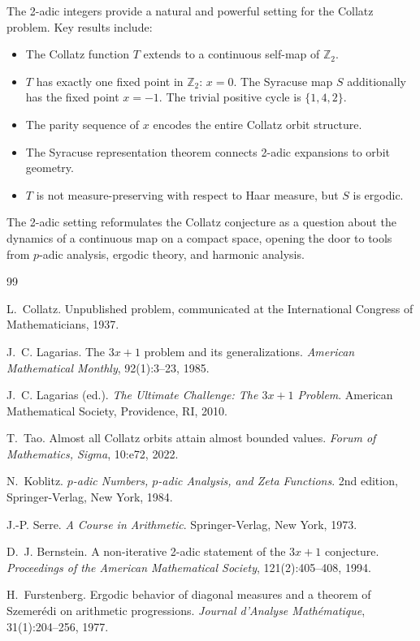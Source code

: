 \documentclass[12pt,a4paper]{article}
\begin{document}
The 2-adic integers provide a natural and powerful setting for the Collatz problem.
Key results include:
\begin{itemize}
  \item The Collatz function $T$ extends to a continuous self-map of $\mathbb{Z}_2$.
  \item $T$ has exactly one fixed point in $\mathbb{Z}_2$: $x=0$. The Syracuse map $S$ additionally has the fixed point $x=-1$. The trivial positive cycle is $\{1, 4, 2\}$.
  \item The parity sequence of $x$ encodes the entire Collatz orbit structure.
  \item The Syracuse representation theorem connects 2-adic expansions to orbit geometry.
  \item $T$ is not measure-preserving with respect to Haar measure, but $S$ is ergodic.
\end{itemize}
The 2-adic setting reformulates the Collatz conjecture as a question about the dynamics
of a continuous map on a compact space, opening the door to tools from $p$-adic analysis,
ergodic theory, and harmonic analysis.

\begin{thebibliography}{99}

L.~Collatz.
\newblock Unpublished problem, communicated at the International Congress of Mathematicians, 1937.

J.~C. Lagarias.
\newblock The $3x+1$ problem and its generalizations.
\newblock \emph{American Mathematical Monthly}, 92(1):3--23, 1985.

J.~C. Lagarias (ed.).
\newblock \emph{The Ultimate Challenge: The $3x+1$ Problem}.
\newblock American Mathematical Society, Providence, RI, 2010.

T.~Tao.
\newblock Almost all Collatz orbits attain almost bounded values.
\newblock \emph{Forum of Mathematics, Sigma}, 10:e72, 2022.

N.~Koblitz.
\newblock \emph{$p$-adic Numbers, $p$-adic Analysis, and Zeta Functions}.
\newblock 2nd edition, Springer-Verlag, New York, 1984.

J.-P. Serre.
\newblock \emph{A Course in Arithmetic}.
\newblock Springer-Verlag, New York, 1973.

D.~J. Bernstein.
\newblock A non-iterative 2-adic statement of the $3x+1$ conjecture.
\newblock \emph{Proceedings of the American Mathematical Society}, 121(2):405--408, 1994.

H.~Furstenberg.
\newblock Ergodic behavior of diagonal measures and a theorem of Szemer\'edi on arithmetic progressions.
\newblock \emph{Journal d'Analyse Math\'ematique}, 31(1):204--256, 1977.

\end{thebibliography}
\end{document}
